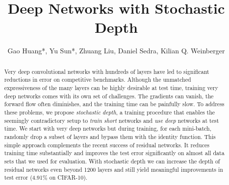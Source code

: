 \documentclass[runningheads]{llncs}
\begin{document}
\pagestyle{headings}

\mainmatter

\def\ECCV16SubNumber{1641}  

\newcommand{\name}{stochastic depth}



\title{Deep Networks with Stochastic Depth}





\author{{Gao Huang*, Yu Sun*, Zhuang Liu, Daniel Sedra, Kilian Q. Weinberger}}


\maketitle



\begin{abstract}

Very deep convolutional networks with hundreds of layers have led to significant reductions in error on competitive benchmarks. Although the unmatched expressiveness of the many layers can be highly desirable at test time, training very deep networks comes with its own set of challenges. The gradients can vanish, the forward flow often diminishes, and the training time can be painfully slow. To address these problems, we propose \emph{\name{}}, a training procedure that enables the seemingly contradictory setup to \emph{train short} networks and \emph{use deep} networks at test time. We start with very deep networks but during training, for each mini-batch, randomly drop a subset of layers and bypass them with the identity function. This simple approach complements the recent success of residual networks. It reduces training time substantially and improves the test error significantly on almost all data sets that we used for evaluation. With \name{} we can increase the depth of residual networks even beyond 1200 layers and still yield meaningful improvements in test error (4.91\% on CIFAR-10). 


\end{abstract}
\end{document}

